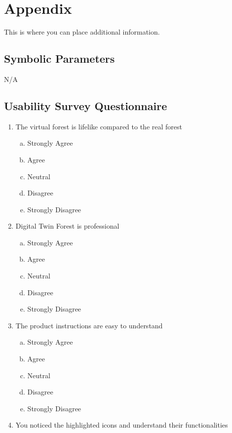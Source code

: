 \documentclass[12pt, titlepage]{article}
\begin{document}
\newpage

\section{Appendix}

This is where you can place additional information.

\subsection{Symbolic Parameters}
N/A

\subsection{Usability Survey Questionnaire}
\centering

\begin{enumerate}
    \item The virtual forest is lifelike compared to the real forest
\begin{enumerate}[a.]
        \item Strongly Agree
        \item Agree
        \item Neutral
        \item Disagree
        \item Strongly Disagree
    \end{enumerate}
    \item Digital Twin Forest is professional
    \begin{enumerate}[a.]
        \item Strongly Agree
        \item Agree
        \item Neutral
        \item Disagree
        \item Strongly Disagree
    \end{enumerate}
    \item The product instructions are easy to understand
    \begin{enumerate}[a.]
        \item Strongly Agree
        \item Agree
        \item Neutral
        \item Disagree
        \item Strongly Disagree
        \end{enumerate}
    \item You noticed the highlighted icons and understand their functionalities

\end{enumerate}
\end{document}

